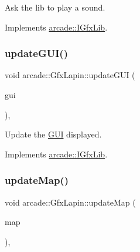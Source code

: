 Ask the lib to play a sound. 



Implements \hyperlink{classarcade_1_1_i_gfx_lib_a0b965ed555739ef366b27583799d794c}{arcade\+::\+I\+Gfx\+Lib}.

\mbox{\label{classarcade_1_1_gfx_lapin_a6b226d0278ba5d43e956eb28557124ef}} 
\subsubsection{\texorpdfstring{update\+G\+U\+I()}{updateGUI()}}
{\footnotesize\ttfamily void arcade\+::\+Gfx\+Lapin\+::update\+G\+UI (\begin{DoxyParamCaption}\item[{\hyperlink{classarcade_1_1_i_g_u_i}{I\+G\+UI} \&}]{gui }\end{DoxyParamCaption})\hspace{0.3cm}{\ttfamily [override]}, {\ttfamily [virtual]}}



Update the \hyperlink{classarcade_1_1_g_u_i}{G\+UI} displayed. 



Implements \hyperlink{classarcade_1_1_i_gfx_lib_ae3f443cc341512433815e8bf2dee3e0d}{arcade\+::\+I\+Gfx\+Lib}.

\mbox{\label{classarcade_1_1_gfx_lapin_a06f4eb48bd1ea7749d81870211115a46}} 
\subsubsection{\texorpdfstring{update\+Map()}{updateMap()}}
{\footnotesize\ttfamily void arcade\+::\+Gfx\+Lapin\+::update\+Map (\begin{DoxyParamCaption}\item[{\hyperlink{classarcade_1_1_i_map}{I\+Map} const \&}]{map }\end{DoxyParamCaption})\hspace{0.3cm}{\ttfamily [override]}, {\ttfamily [virtual]}}



